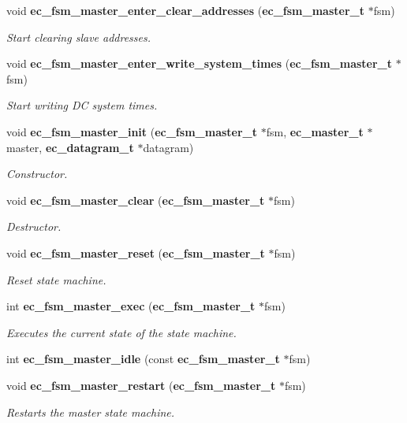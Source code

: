 \begin{DoxyCompactItemize}
void {\bf ec\-\_\-fsm\-\_\-master\-\_\-enter\-\_\-clear\-\_\-addresses} ({\bf ec\-\_\-fsm\-\_\-master\-\_\-t} $\ast$fsm)
\begin{DoxyCompactList}\small\item\em Start clearing slave addresses. \end{DoxyCompactList}\item 
void {\bf ec\-\_\-fsm\-\_\-master\-\_\-enter\-\_\-write\-\_\-system\-\_\-times} ({\bf ec\-\_\-fsm\-\_\-master\-\_\-t} $\ast$fsm)
\begin{DoxyCompactList}\small\item\em Start writing D\-C system times. \end{DoxyCompactList}\item 
void {\bf ec\-\_\-fsm\-\_\-master\-\_\-init} ({\bf ec\-\_\-fsm\-\_\-master\-\_\-t} $\ast$fsm, {\bf ec\-\_\-master\-\_\-t} $\ast$master, {\bf ec\-\_\-datagram\-\_\-t} $\ast$datagram)
\begin{DoxyCompactList}\small\item\em Constructor. \end{DoxyCompactList}\item 
void {\bf ec\-\_\-fsm\-\_\-master\-\_\-clear} ({\bf ec\-\_\-fsm\-\_\-master\-\_\-t} $\ast$fsm)
\begin{DoxyCompactList}\small\item\em Destructor. \end{DoxyCompactList}\item 
void {\bf ec\-\_\-fsm\-\_\-master\-\_\-reset} ({\bf ec\-\_\-fsm\-\_\-master\-\_\-t} $\ast$fsm)
\begin{DoxyCompactList}\small\item\em Reset state machine. \end{DoxyCompactList}\item 
int {\bf ec\-\_\-fsm\-\_\-master\-\_\-exec} ({\bf ec\-\_\-fsm\-\_\-master\-\_\-t} $\ast$fsm)
\begin{DoxyCompactList}\small\item\em Executes the current state of the state machine. \end{DoxyCompactList}\item 
int {\bf ec\-\_\-fsm\-\_\-master\-\_\-idle} (const {\bf ec\-\_\-fsm\-\_\-master\-\_\-t} $\ast$fsm)
\item 
void {\bf ec\-\_\-fsm\-\_\-master\-\_\-restart} ({\bf ec\-\_\-fsm\-\_\-master\-\_\-t} $\ast$fsm)
\begin{DoxyCompactList}\small\item\em Restarts the master state machine. \end{DoxyCompactList}\item 

\end{DoxyCompactItemize}
